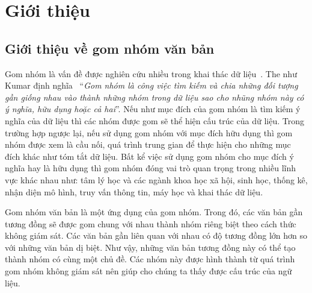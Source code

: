 \chapter{Giới thiệu}
\label{Chapter1}

\section{Giới thiệu về gom nhóm văn bản}

Gom nhóm là vấn đề được nghiên cứu nhiều trong khai thác dữ liệu~\cite{Jain-Dubes, Jardin-Rijsbergen, Ji-Xu, Jolliffee}.
The như Kumar định nghĩa~\cite{Vipin-Kumar} ``\textit{Gom nhóm là công việc tìm kiếm và chia những đối tượng gần giống nhau vào thành những nhóm trong dữ liệu sao cho nhũng nhóm này có ý nghĩa, hữu dụng hoặc cả hai}''. %
Nếu như mục đích của gom nhóm là tìm kiếm ý nghĩa của dữ liệu thì các nhóm được gom sẽ thể hiện cấu trúc của dữ liệu.
Trong trường hợp ngược lại, nếu sử dụng gom nhóm với mục đích hữu dụng thì gom nhóm được xem là cầu nối, quá trình trung gian để thực hiện cho những mục đích khác như tóm tắt dữ liệu.
Bất kể việc sử dụng gom nhóm cho mục đích ý nghĩa hay là hữu dụng thì gom nhóm đóng vai trò quan trọng trong nhiều lĩnh vực khác nhau như: tâm lý học và các ngành khoa học xã hội, sinh học, thống kê, nhận diện mô hình, truy vấn thông tin, máy học và khai thác dữ liệu.

Gom nhóm văn bản là một ứng dụng của gom nhóm.
Trong đó, các văn bản gần tương đồng sẽ được gom chung với nhau thành nhóm riêng biệt theo cách thức không giám sát.
Các văn bản gần liên quan với nhau có độ tương đồng lớn hơn so với những văn bản dị biệt.
Như vậy, những văn bản tương đồng này có thể tạo thành nhóm có cùng một chủ đề.
Các nhóm này được hình thành từ quá trình gom nhóm không giám sát nên giúp cho chúng ta thấy được cấu trúc của ngữ liệu.

